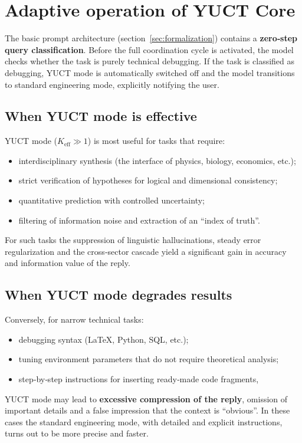 \documentclass[12pt,a4paper]{article}
\begin{document}
	\section{Adaptive operation of YUCT Core}
	\label{sec:adaptive}
	
	The basic prompt architecture (section~\ref{sec:formalization}) contains a \textbf{zero‑step query classification}.
	Before the full coordination cycle is activated, the model checks whether the task is purely technical debugging.
	If the task is classified as debugging, YUCT mode is automatically switched off and the model transitions to standard engineering mode, explicitly notifying the user.
	
	\subsection{When YUCT mode is effective}
	YUCT mode (\(K_{\mathrm{eff}} \gg 1\)) is most useful for tasks that require:
	\begin{itemize}
		\item interdisciplinary synthesis (the interface of physics, biology, economics, etc.);
		\item strict verification of hypotheses for logical and dimensional consistency;
		\item quantitative prediction with controlled uncertainty;
		\item filtering of information noise and extraction of an ``index of truth''.
	\end{itemize}
	For such tasks the suppression of linguistic hallucinations, steady error regularization and the cross‑sector cascade yield a significant gain in accuracy and information value of the reply.
	
	\subsection{When YUCT mode degrades results}
	Conversely, for narrow technical tasks:
	\begin{itemize}
		\item debugging syntax (LaTeX, Python, SQL, etc.);
		\item tuning environment parameters that do not require theoretical analysis;
		\item step‑by‑step instructions for inserting ready‑made code fragments,
	\end{itemize}
	YUCT mode may lead to \textbf{excessive compression of the reply}, omission of important details and a false impression that the context is ``obvious''. In these cases the standard engineering mode, with detailed and explicit instructions, turns out to be more precise and faster.
	
\end{document}
